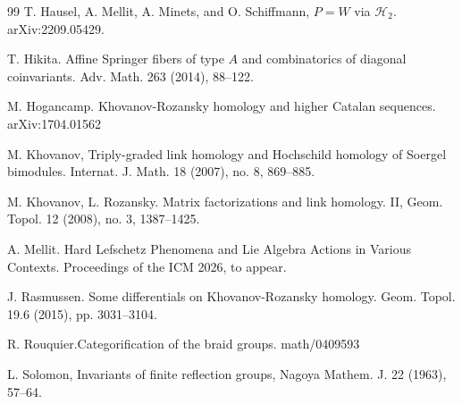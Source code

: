 \documentclass{amsart}
\numberwithin{equation}{section}
\theoremstyle{definition}
\begin{document}
\begin{thebibliography}{99}
 T. Hausel, A. Mellit, A. Minets, and O. Schiffmann, $P = W$ via $\mathcal{H}_2$.
arXiv:2209.05429.

  T. Hikita. Affine Springer fibers of type  $A$  and combinatorics of diagonal coinvariants.
Adv. Math. 263 (2014), 88--122.

 M. Hogancamp. Khovanov-Rozansky homology and higher Catalan sequences. arXiv:1704.01562 

 M. Khovanov, Triply-graded link homology and Hochschild homology of
Soergel bimodules. Internat. J. Math. 18 (2007), no. 8, 869--885. 

 M. Khovanov, L. Rozansky. Matrix factorizations and link homology.
II, Geom. Topol. 12 (2008), no. 3, 1387--1425.

 A. Mellit. Hard Lefschetz Phenomena and Lie Algebra Actions in Various Contexts. Proceedings of the ICM 2026, to appear.

 J. Rasmussen. Some differentials on Khovanov-Rozansky homology. Geom. Topol. 19.6 (2015), pp.
3031--3104.


 R. Rouquier.Categorification of the braid groups.
math/0409593 

  L. Solomon, Invariants of finite reflection groups, Nagoya Mathem. J. 22 (1963), 57--64.

\end{thebibliography}
\end{document}
